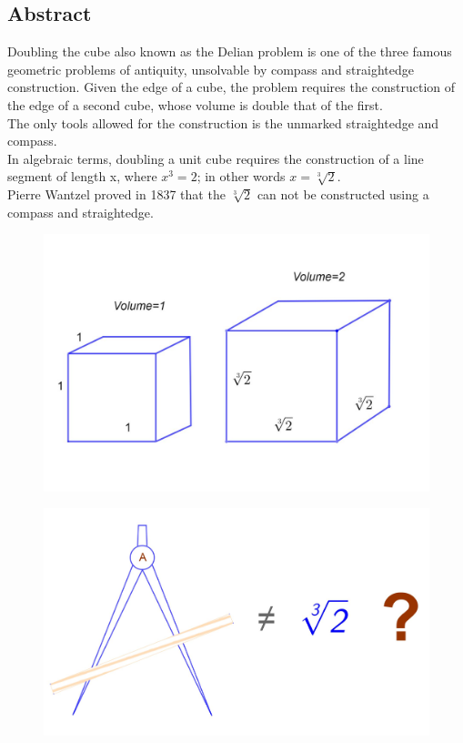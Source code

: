 \documentclass[12pt, letterpaper, oneside]{report}
\begin{document}
\begin{center}
\section*{Abstract}
\end{center}
Doubling the cube also known as the Delian problem is one of the three famous geometric problems of antiquity, unsolvable by compass and straightedge construction. Given the edge of a cube, the problem requires the construction of the edge of a second cube, whose volume is double that of the first.
\\
The only tools allowed for the construction is the unmarked straightedge and compass.
\\
In algebraic terms, doubling a unit cube requires the construction of a line segment of length x, where $x^{3} = 2$; in other words $x =\sqrt[3]{2}$.\\
Pierre Wantzel proved in 1837 that the $\sqrt[3]{2}$ can not be constructed using a compass and straightedge.
\\
\begin{figure}[h]
	\centering
	\includegraphics[width=0.7\linewidth]{images/cubes.jpg}
	\label{fig:cubes}
\end{figure}
\begin{figure}[h]
	\centering
	\includegraphics[width=0.8\linewidth]{images/compass.jpg}
	\label{fig:compass}
\end{figure}
\newpage
\end{document}

